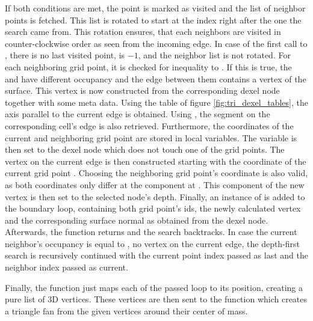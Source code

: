 If both conditions are met, the point is marked as visited and the list of neighbor points is fetched.
This list is rotated to start at the index right after the one the search came from.
This rotation ensures, that each neighbors are visited in counter-clockwise order as seen from the incoming edge.
In case of the first call to , there is no last visited point,  is $-1$, and the neighbor list is not rotated.
For each neighboring grid point, it is checked for inequality to .
If this is true, the  and  have different occupancy and the edge between them contains a vertex of the surface.
This vertex is now constructed from the corresponding dexel node together with some meta data.
Using the  table of figure \ref{fig:tri_dexel_tables}, the axis parallel to the current edge is obtained.
Using , the segment on the corresponding cell's edge is also retrieved.
Furthermore, the coordinates of the current and neighboring grid point are stored in local variables.
The  variable is then set to the dexel node which does not touch one of the grid points.
The vertex on the current edge is then constructed starting with the coordinate of the current grid point .
Choosing the neighboring grid point's coordinate is also valid, as both coordinates only differ at the component at .
This component of the new vertex is then set to the selected node's depth.
Finally, an instance of  is added to the boundary loop, containing both grid point's ids, the newly calculated vertex and the corresponding surface normal as obtained from the dexel node.
Afterwards, the function returns and the search backtracks.
In case the current neighbor's occupancy is equal to , \ie no vertex on the current edge, the depth-first search is recursively continued with the current point index passed as last and the neighbor index passed as current.

Finally, the  function just maps each  of the passed loop to its position, creating a pure list of 3D vertices.
These vertices are then sent to the  function which creates a triangle fan from the given vertices around their center of mass.

